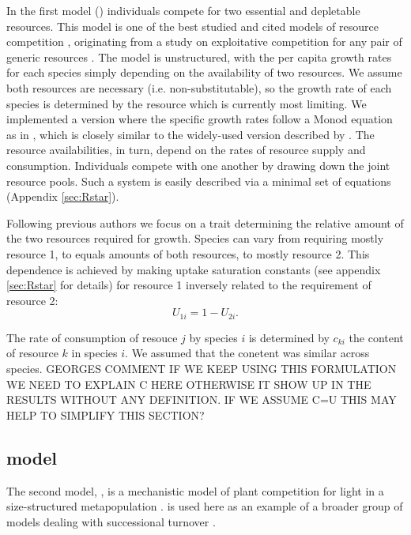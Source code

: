 \documentclass[a4paper,11pt]{article}
\begin{document}
In the first model (\Rstar) individuals compete for two essential and
depletable resources. This model is one of the best studied and cited
models of resource competition \citep{Tilman-1977, Tilman-1982,
  Huisman-2001}, originating from a study on exploitative competition
for any pair of generic resources \citep{Leon-1975}. The model is
unstructured, with the per capita growth rates for each species simply
depending on the availability of two resources.  We assume both
resources are necessary (i.e. non-substitutable), so the growth rate
of each species is determined by the resource which is currently most
limiting.  We implemented a version where the specific growth rates
follow a Monod equation as in \citet{Huisman-2001}, which is closely
similar to the widely-used version described by \citet{Tilman-1977,
  Tilman-1982}.  The resource availabilities, in turn, depend on the
rates of resource supply and consumption. Individuals compete with one
another by drawing down the joint resource pools. Such a system is
easily described via a minimal set of equations (Appendix
\ref{sec:Rstar}).

Following previous authors \citep{Tilman-1985, Schreiber-2003,
  Fox-2008} we focus on a trait determining the relative amount of the
two resources required for growth. Species can vary from requiring mostly resource 1, to equals
amounts of both resources, to mostly resource 2. This dependence is
achieved by making uptake saturation constants (see appendix
\ref{sec:Rstar} for details) for resource 1 inversely related to the
requirement of resource 2:
\begin{equation}
\label{eq:R3}
U_{1i} = 1 - U_{2i}.
\end{equation}

The rate of consumption of resouce $j$ by species $i$ is determined by $c_{ki}$ the content of resource $k$ in species $i$. We assumed that the conetent was similar across species. GEORGES COMMENT IF WE KEEP USING THIS FORMULATION WE NEED TO EXPLAIN C HERE OTHERWISE IT SHOW UP IN THE RESULTS WITHOUT ANY DEFINITION. IF WE ASSUME C=U THIS MAY HELP TO SIMPLIFY THIS SECTION?

\subsection{\plant model}

The second model, \plant, is a mechanistic model of plant competition
for light in a size-structured metapopulation \citep{Falster-2011,
Falster-2015}. \plant is used here as an example of a broader group of models
dealing with successional turnover \citep{Huston-1987,Kohyama-1993,Moorcroft-2001,Falster-2011}.
\end{document}
